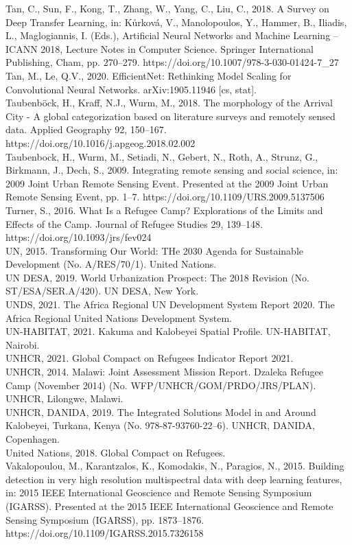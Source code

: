\documentclass[11pt, a4paper, twoside]{report}
\begin{document}
Tan, C., Sun, F., Kong, T., Zhang, W., Yang, C., Liu, C., 2018. A Survey on Deep Transfer Learning, in: Kůrková, V., Manolopoulos, Y., Hammer, B., Iliadis, L., Maglogiannis, I. (Eds.), Artificial Neural Networks and Machine Learning – ICANN 2018, Lecture Notes in Computer Science. Springer International Publishing, Cham, pp. 270–279. https://doi.org/10.1007/978-3-030-01424-7\_27\\
Tan, M., Le, Q.V., 2020. EfficientNet: Rethinking Model Scaling for Convolutional Neural Networks. arXiv:1905.11946 [cs, stat].\\
Taubenböck, H., Kraff, N.J., Wurm, M., 2018. The morphology of the Arrival City - A global categorization based on literature surveys and remotely sensed data. Applied Geography 92, 150–167. https://doi.org/10.1016/j.apgeog.2018.02.002\\
Taubenbock, H., Wurm, M., Setiadi, N., Gebert, N., Roth, A., Strunz, G., Birkmann, J., Dech, S., 2009. Integrating remote sensing and social science, in: 2009 Joint Urban Remote Sensing Event. Presented at the 2009 Joint Urban Remote Sensing Event, pp. 1–7. https://doi.org/10.1109/URS.2009.5137506\\
Turner, S., 2016. What Is a Refugee Camp? Explorations of the Limits and Effects of the Camp. Journal of Refugee Studies 29, 139–148. https://doi.org/10.1093/jrs/fev024\\
UN, 2015. Transforming Our World: THe 2030 Agenda for Sustainable Development (No. A/RES/70/1). United Nations.\\
UN DESA, 2019. World Urbanization Prospect: The 2018 Revision (No. ST/ESA/SER.A/420). UN DESA, New York.\\
UNDS, 2021. The Africa Regional UN Development System Report 2020. The Africa Regional United Nations Development System.\\
UN-HABITAT, 2021. Kakuma and Kalobeyei Spatial Profile. UN-HABITAT, Nairobi.\\
UNHCR, 2021. Global Compact on Refugees Indicator Report 2021.\\
UNHCR, 2014. Malawi: Joint Assessment Mission Report. Dzaleka Refugee Camp (November 2014) (No. WFP/UNHCR/GOM/PRDO/JRS/PLAN). UNHCR, Lilongwe, Malawi.\\
UNHCR, DANIDA, 2019. The Integrated Solutions Model in and Around Kalobeyei, Turkana, Kenya (No. 978-87-93760-22–6). UNHCR, DANIDA, Copenhagen.\\
United Nations, 2018. Global Compact on Refugees.\\
Vakalopoulou, M., Karantzalos, K., Komodakis, N., Paragios, N., 2015. Building detection in very high resolution multispectral data with deep learning features, in: 2015 IEEE International Geoscience and Remote Sensing Symposium (IGARSS). Presented at the 2015 IEEE International Geoscience and Remote Sensing Symposium (IGARSS), pp. 1873–1876. https://doi.org/10.1109/IGARSS.2015.7326158\\
\end{document}

